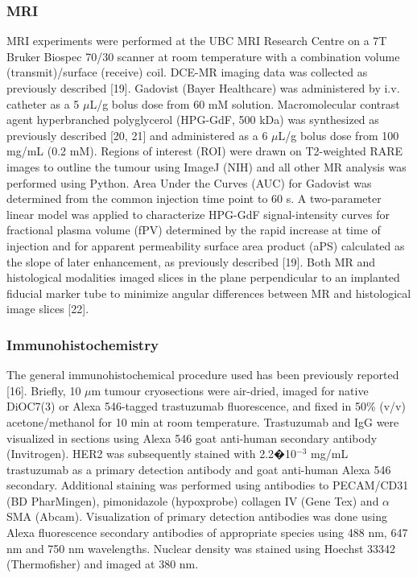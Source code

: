 \subsubsection{MRI}
MRI experiments were performed at the UBC MRI Research Centre on a 7T Bruker Biospec 70/30 scanner at room temperature with a combination volume (transmit)/surface (receive) coil.
DCE-MR imaging data was collected as previously described [19].
Gadovist (Bayer Healthcare) was administered by i.v. catheter as a 5 $\mu$L/g bolus dose from 60 mM solution.
Macromolecular contrast agent hyperbranched polyglycerol (HPG-GdF, 500 kDa) was synthesized as previously described [20, 21] and administered as a 6 $\mu$L/g bolus dose from 100 mg/mL (0.2 mM).
Regions of interest (ROI) were drawn on T2-weighted RARE images to outline the tumour using ImageJ (NIH) and all other MR analysis was performed using Python.
Area Under the Curves (AUC) for Gadovist was determined from the common injection time point to 60 s.
A two-parameter linear model was applied to characterize \ac{HPG-GdF} signal-intensity curves for fractional plasma volume (fPV) determined by the rapid increase at time of injection and for apparent permeability surface area product (aPS) calculated as the slope of later enhancement, as previously described [19].
Both MR and histological modalities imaged slices in the plane perpendicular to an implanted fiducial marker tube to minimize angular differences between MR and histological image slices [22].

\subsubsection{Immunohistochemistry}
The general immunohistochemical procedure used has been previously reported [16].
Briefly, 10 $\mu$m tumour cryosections were air-dried, imaged for native DiOC7(3) or Alexa 546-tagged trastuzumab fluorescence, and fixed in 50\% (v/v) acetone/methanol for 10 min at room temperature.
Trastuzumab and IgG were visualized in sections using Alexa 546 goat anti-human secondary antibody (Invitrogen).
HER2 was subsequently stained with 2.2�10$^{-3}$ mg/mL trastuzumab as a primary detection antibody and goat anti-human Alexa 546 secondary.
Additional staining was performed using antibodies to PECAM/CD31 (BD PharMingen), pimonidazole (hypoxprobe) collagen IV (Gene Tex) and $\alpha$SMA (Abcam).
Visualization of primary detection antibodies was done using Alexa fluorescence secondary antibodies of appropriate species using 488 nm, 647 nm and 750 nm wavelengths.
Nuclear density was stained using Hoechst 33342 (Thermofisher) and imaged at 380 nm.

